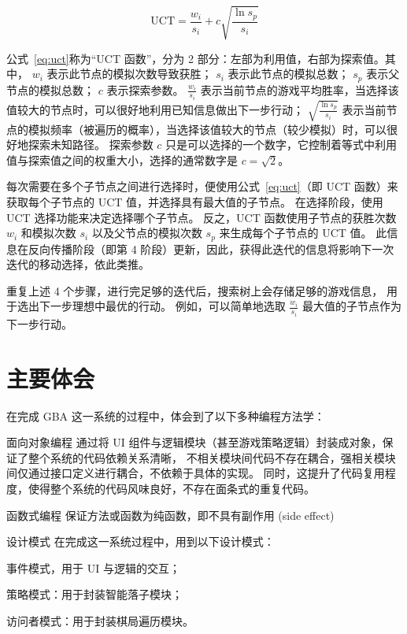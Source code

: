 \documentclass[UTF8,cs4size]{ctexart}
\begin{document}
\begin{equation}
  \text{UCT} = \frac{w_i}{s_i} + c\sqrt{\frac{\ln{s_p}}{s_i}}
  \label{eq:uct}
\end{equation}

公式~\eqref{eq:uct}称为“UCT 函数”，分为 2 部分：左部为利用值，右部为探索值。其中，
$w_i$ 表示此节点的模拟次数导致获胜；
$s_i$ 表示此节点的模拟总数；
$s_p$ 表示父节点的模拟总数；
$c$ 表示探索参数。
$\frac{w_i}{s_i}$ 表示当前节点的游戏平均胜率，当选择该值较大的节点时，可以很好地利用已知信息做出下一步行动；
$\sqrt{\frac{\ln{s_p}}{s_i}}$ 表示当前节点的模拟频率（被遍历的概率），当选择该值较大的节点（较少模拟）时，可以很好地探索未知路径。
探索参数 $c$ 只是可以选择的一个数字，它控制着等式中利用值与探索值之间的权重大小，选择的通常数字是 $c = \sqrt{2}$。

每次需要在多个子节点之间进行选择时，便使用公式~\eqref{eq:uct}（即 UCT 函数）来获取每个子节点的 UCT 值，并选择具有最大值的子节点。
在选择阶段，使用 UCT 选择功能来决定选择哪个子节点。
反之，UCT 函数使用子节点的获胜次数 $w_i$ 和模拟次数 $s_i$ 以及父节点的模拟次数 $s_p$ 来生成每个子节点的 UCT 值。
此信息在反向传播阶段（即第 4 阶段）更新，因此，获得此迭代的信息将影响下一次迭代的移动选择，依此类推。

重复上述 4 个步骤，进行完足够的迭代后，搜索树上会存储足够的游戏信息，
用于选出下一步理想中最优的行动。
例如，可以简单地选取 $\frac{w_i}{s_i}$ 最大值的子节点作为下一步行动。

\clearpage

\section{主要体会}

在完成 GBA 这一系统的过程中，体会到了以下多种编程方法学：

\begin{compactitem}
  \item 面向对象编程
  通过将 UI 组件与逻辑模块（甚至游戏策略逻辑）封装成对象，保证了整个系统的代码依赖关系清晰，
  不相关模块间代码不存在耦合，强相关模块间仅通过接口定义进行耦合，不依赖于具体的实现。
  同时，这提升了代码复用程度，使得整个系统的代码风味良好，不存在面条式的重复代码。
  \item 函数式编程
  保证方法或函数为纯函数，即不具有副作用 (side effect)
  \item 设计模式
  在完成这一系统过程中，用到以下设计模式：
  \begin{compactitem}
    \item 事件模式，用于 UI 与逻辑的交互；
    \item 策略模式：用于封装智能落子模块；
    \item 访问者模式：用于封装棋局遍历模块。
  \end{compactitem}
\end{compactitem}

\clearpage



\clearpage
\end{document}

